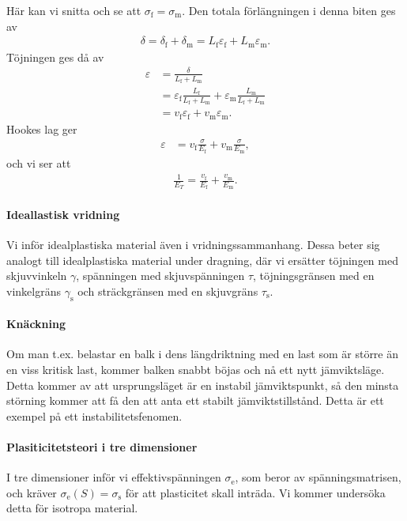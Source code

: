 Här kan vi snitta och se att $\sigma_{\text{f}} = \sigma_{\text{m}}$. Den totala förlängningen i denna biten ges av
\begin{align*}
	\delta = \delta_{\text{f}} + \delta_{\text{m}} = L_{\text{f}}\varepsilon_{\text{f}} + L_{\text{m}}\varepsilon_{\text{m}}.
\end{align*}
Töjningen ges då av
\begin{align*}
	\varepsilon &= \frac{\delta}{L_{\text{f}} + L_{\text{m}}} \\
	            &= \varepsilon_{\text{f}}\frac{L_{\text{f}}}{L_{\text{f}} + L_{\text{m}}} + \varepsilon_{\text{m}}\frac{L_{\text{m}}}{L_{\text{f}} + L_{\text{m}}} \\
	            &= v_{\text{f}}\varepsilon_{\text{f}} + v_{\text{m}}\varepsilon_{\text{m}}.
\end{align*}
Hookes lag ger
\begin{align*}
	\varepsilon &= v_{\text{f}}\frac{\sigma}{E_{\text{f}}} + v_{\text{m}}\frac{\sigma}{E_{\text{m}}},
\end{align*}
och vi ser att
\begin{align*}
	\frac{1}{E_{T}} = \frac{v_{\text{f}}}{E_{\text{f}}} + \frac{v_{\text{m}}}{E_{\text{m}}}.
\end{align*}

\paragraph{Ideallastisk vridning}
Vi inför idealplastiska material även i vridningssammanhang. Dessa beter sig analogt till idealplastiska material under dragning, där vi ersätter töjningen med skjuvvinkeln $\gamma$, spänningen med skjuvspänningen $\tau$, töjningsgränsen med en vinkelgräns $\gamma_{\text{s}}$ och sträckgränsen med en skjuvgräns $\tau_{\text{s}}$.

\paragraph{Knäckning}
Om man t.ex. belastar en balk i dens längdriktning med en last som är större än en viss kritisk last, kommer balken snabbt böjas och nå ett nytt jämviktsläge. Detta kommer av att ursprungsläget är en instabil jämviktspunkt, så den minsta störning kommer att få den att anta ett stabilt jämviktstillstånd. Detta är ett exempel på ett instabilitetsfenomen.

\paragraph{Plasiticitetsteori i tre dimensioner}
I tre dimensioner inför vi effektivspänningen $\sigma_{\text{e}}$, som beror av spänningsmatrisen, och kräver $\sigma_{\text{e}}(S) = \sigma_{\text{s}}$ för att plasticitet skall inträda. Vi kommer undersöka detta för isotropa material.

